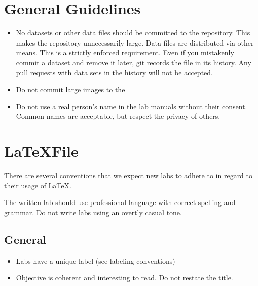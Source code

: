 \label{lab:template}

\section{General Guidelines}
\begin{itemize}
\item No datasets or other data files should be committed to the repository.  This makes the repository unnecessarily large.  Data files are distributed via other means.  This is a strictly enforced requirement.  Even if you mistakenly commit a dataset and remove it later, git records the file in its history.  Any pull requests with data sets in the history will not be accepted.
\item Do not commit large images to the 
\item Do not use a real person's name in the lab manuals without their consent.  Common names are acceptable, but respect the privacy of others.
\end{itemize}


\section{\LaTeX File}
There are several conventions that we expect new labs to adhere to in regard to their usage of \LaTeX.

The written lab should use professional language with correct spelling and grammar.
Do not write labs using an overtly casual tone.

\subsection{General}
\begin{itemize}
\item Labs have a unique label (see labeling conventions)
\item Objective is coherent and interesting to read. Do not restate the title.
\end{itemize}

